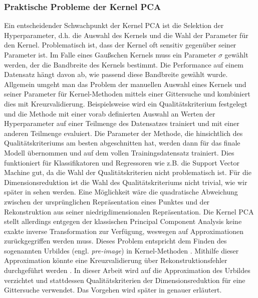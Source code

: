 \subsubsection{Praktische Probleme der Kernel PCA}
\label{ch:MethodenDerDimRed:statistisch:kPCA:AuswahlKF}

Ein entscheidender Schwachpunkt der Kernel PCA ist die Selektion der Hyperparameter, d.h. die
Auswahl des Kernels und die Wahl der Parameter für den Kernel. Problematisch ist, dass der Kernel
oft sensitiv gegenüber seiner Parameter ist. Im Falle eines Gaußschen Kernels muss ein Parameter
$\sigma$ gewählt werden, der die Bandbreite des Kernels bestimmt. Die Performance auf einem
Datensatz hängt davon ab, wie passend diese Bandbreite gewählt wurde. Allgemein umgeht man das
Problem der manuellen Auswahl eines Kernels und seiner Parameter für Kernel-Methoden mittels einer
Gittersuche und kombiniert dies mit Kreuzvalidierung. Beispielsweise wird ein Qualitätskriterium
festgelegt und die Methode mit einer vorab definierten Auswahl an Werten der Hyperparameter auf
einer Teilmenge des Datensatzes trainiert und mit einer anderen Teilmenge evaluiert. Die Parameter
der Methode, die hinsichtlich des Qualitätskriteriums am besten abgeschnitten hat, werden dann für
das finale Modell übernommen und auf dem vollen Trainingsdatensatz trainiert. Dies funktioniert für
Klassifikatoren und Regressoren wie z.B. die Support Vector Machine gut, da die Wahl der
Qualitätskriterien nicht problematisch ist. Für die Dimensionsreduktion ist die Wahl des
Qualitätskriteriums nicht trivial, wie wir später in
 sehen werden. Eine Möglichkeit
wäre die quadratische Abweichung zwischen der ursprünglichen Repräsentation eines Punktes und der
Rekonstruktion aus seiner niedrigdimensionalen Repräsentation. Die Kernel PCA stellt allerdings
entgegen der klassischen Principal Component Analysis keine exakte inverse Transformation zur
Verfügung, weswegen auf Approximationen zurückgegriffen werden muss. Dieses Problem entspricht dem
Finden des sogenannten Urbildes (engl. \textit{pre-image}) in Kernel-Methoden \parencite{Kwok.2004}. Mithilfe dieser Approximation könnte eine Kreuzvalidierung über
Rekonstruktionsfehler durchgeführt werden \parencite[siehe z.B.][]{Alam.2014}. In dieser Arbeit wird auf die Approximation des Urbildes
verzichtet und stattdessen Qualitätskriterien der Dimensionsreduktion für eine Gittersuche
verwendet. Das Vorgehen wird später in 
genauer erläutert.

